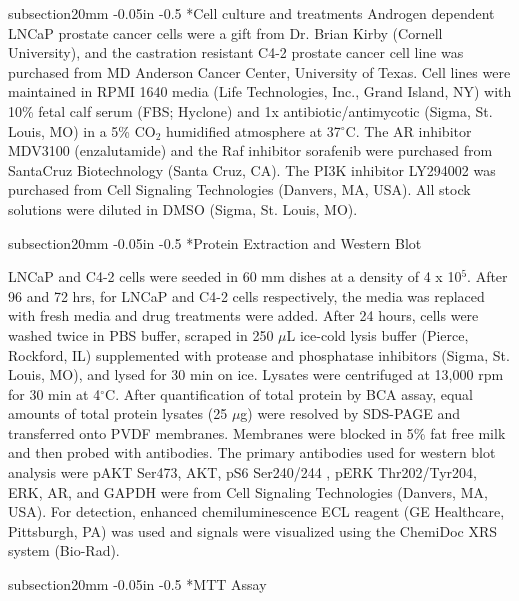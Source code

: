 \documentclass[12pt]{article}
\makeatletter
\renewcommand\subsection{\@startsection
	{subsection}{2}{0mm}
	{-0.05in}
	{-0.5\baselineskip}
	{\normalfont\normalsize\bfseries}}
\makeatother
\begin{document}
\subsection*{Cell culture and treatments}
Androgen dependent LNCaP prostate cancer cells were a gift from Dr. Brian Kirby (Cornell University), and the castration resistant C4-2 prostate cancer cell line was purchased from MD Anderson Cancer Center, University of Texas. Cell lines were maintained in RPMI 1640 media (Life Technologies, Inc., Grand Island, NY) with 10\% fetal calf serum (FBS; Hyclone) and 1x antibiotic/antimycotic (Sigma, St. Louis, MO) in a 5\% CO$_2$ humidified atmosphere at 37$^{\circ}$C. The AR inhibitor MDV3100 (enzalutamide) and the Raf inhibitor sorafenib were purchased from SantaCruz Biotechnology (Santa Cruz, CA). The PI3K inhibitor LY294002 was purchased from Cell Signaling Technologies (Danvers, MA, USA). All stock solutions were diluted in DMSO (Sigma, St. Louis, MO). 

\subsection*{Protein Extraction and Western Blot}

LNCaP and C4-2 cells were seeded in 60 mm dishes at a density of 4 x 10$^{5}$. After 96 and 72 hrs, for LNCaP and C4-2 cells respectively, the media was replaced with fresh media and drug treatments were added. After 24 hours, cells were washed twice in PBS buffer, scraped in 250 $\mu$L ice-cold lysis buffer (Pierce, Rockford, IL) supplemented with protease and phosphatase inhibitors (Sigma, St. Louis, MO), and lysed for 30 min on ice. Lysates were centrifuged at 13,000 rpm for 30 min at 4$^{\circ}$C. After quantification of total protein by BCA assay, equal amounts of total protein lysates (25 $\mu$g) were resolved by SDS-PAGE and transferred onto PVDF membranes. Membranes were blocked in 5\% fat free milk and then probed with antibodies. The primary antibodies used for western blot analysis were pAKT Ser473, AKT, pS6 Ser240/244 , pERK Thr202/Tyr204, ERK, AR, and GAPDH were from Cell Signaling Technologies (Danvers, MA, USA). For detection, enhanced chemiluminescence ECL reagent (GE Healthcare, Pittsburgh, PA) was used and signals were visualized using the ChemiDoc XRS system (Bio-Rad). 

\subsection*{MTT Assay}
\end{document}
